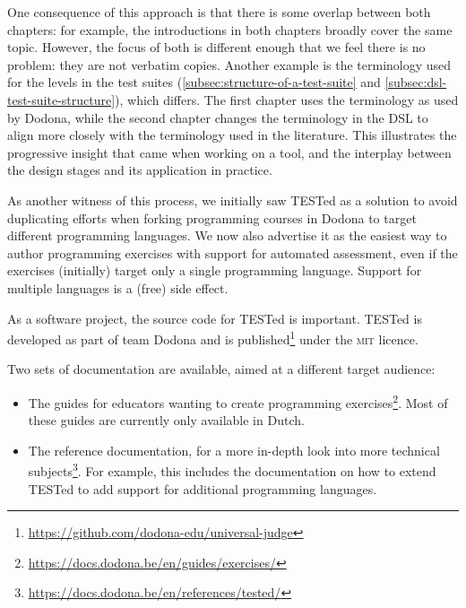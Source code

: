 \documentclass[./main]{subfiles}
\begin{document}
One consequence of this approach is that there is some overlap between both chapters: for example, the introductions in both chapters broadly cover the same topic.
However, the focus of both is different enough that we feel there is no problem: they are not verbatim copies.
Another example is the terminology used for the levels in the test suites (\vref{subsec:structure-of-a-test-suite} and \vref{subsec:dsl-test-suite-structure}), which differs.
The first chapter uses the terminology as used by Dodona, while the second chapter changes the terminology in the DSL to align more closely with the terminology used in the literature.
This illustrates the progressive insight that came when working on a tool, and the interplay between the design stages and its application in practice.

As another witness of this process, we initially saw TESTed as a solution to avoid duplicating efforts when forking programming courses in Dodona to target different programming languages.
We now also advertise it as the easiest way to author programming exercises with support for automated assessment, even if the exercises (initially) target only a single programming language.
Support for multiple languages is a (free) side effect.

As a software project, the source code for TESTed is important.
TESTed is developed as part of team Dodona and is published\footnote{\url{https://github.com/dodona-edu/universal-judge}} under the \textsc{mit} licence.

Two sets of documentation are available, aimed at a different target audience:

\begin{itemize}
    \item The guides for educators wanting to create programming exercises\footnote{\url{https://docs.dodona.be/en/guides/exercises/}}.
          Most of these guides are currently only available in Dutch.
    \item The reference documentation, for a more in-depth look into more technical subjects\footnote{\url{https://docs.dodona.be/en/references/tested/}}.
          For example, this includes the documentation on how to extend TESTed to add support for additional programming languages.
\end{itemize}
\end{document}
